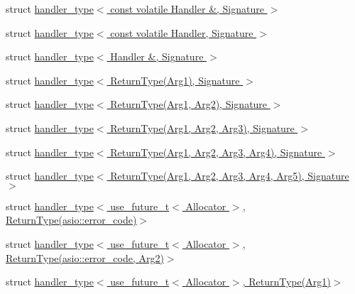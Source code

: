 \begin{DoxyCompactItemize}
\item 
struct \hyperlink{structasio_1_1handler__type_3_01const_01volatile_01_handler_01_6_00_01_signature_01_4}{handler\+\_\+type$<$ const volatile Handler \&, Signature $>$}
\item 
struct \hyperlink{structasio_1_1handler__type_3_01const_01volatile_01_handler_00_01_signature_01_4}{handler\+\_\+type$<$ const volatile Handler, Signature $>$}
\item 
struct \hyperlink{structasio_1_1handler__type_3_01_handler_01_6_00_01_signature_01_4}{handler\+\_\+type$<$ Handler \&, Signature $>$}
\item 
struct \hyperlink{structasio_1_1handler__type_3_01_return_type_07_arg1_08_00_01_signature_01_4}{handler\+\_\+type$<$ Return\+Type(\+Arg1), Signature $>$}
\item 
struct \hyperlink{structasio_1_1handler__type_3_01_return_type_07_arg1_00_01_arg2_08_00_01_signature_01_4}{handler\+\_\+type$<$ Return\+Type(\+Arg1, Arg2), Signature $>$}
\item 
struct \hyperlink{structasio_1_1handler__type_3_01_return_type_07_arg1_00_01_arg2_00_01_arg3_08_00_01_signature_01_4}{handler\+\_\+type$<$ Return\+Type(\+Arg1, Arg2, Arg3), Signature $>$}
\item 
struct \hyperlink{structasio_1_1handler__type_3_01_return_type_07_arg1_00_01_arg2_00_01_arg3_00_01_arg4_08_00_01_signature_01_4}{handler\+\_\+type$<$ Return\+Type(\+Arg1, Arg2, Arg3, Arg4), Signature $>$}
\item 
struct \hyperlink{structasio_1_1handler__type_3_01_return_type_07_arg1_00_01_arg2_00_01_arg3_00_01_arg4_00_01_arg5_08_00_01_signature_01_4}{handler\+\_\+type$<$ Return\+Type(\+Arg1, Arg2, Arg3, Arg4, Arg5), Signature $>$}
\item 
struct \hyperlink{structasio_1_1handler__type_3_01use__future__t_3_01_allocator_01_4_00_01_01_01_01_01_01_01_01_01e03a2a25b6ea2f5e6fbc374eca266e19}{handler\+\_\+type$<$ use\+\_\+future\+\_\+t$<$ Allocator $>$,           Return\+Type(asio\+::error\+\_\+code)$>$}
\item 
struct \hyperlink{structasio_1_1handler__type_3_01use__future__t_3_01_allocator_01_4_00_01_01_01_01_01_01_01_01_01912bb47ba4497b53d32e350e5bfa0a51}{handler\+\_\+type$<$ use\+\_\+future\+\_\+t$<$ Allocator $>$,           Return\+Type(asio\+::error\+\_\+code, Arg2)$>$}
\item 
struct \hyperlink{structasio_1_1handler__type_3_01use__future__t_3_01_allocator_01_4_00_01_return_type_07_arg1_08_4}{handler\+\_\+type$<$ use\+\_\+future\+\_\+t$<$ Allocator $>$, Return\+Type(\+Arg1)$>$}

\end{DoxyCompactItemize}
